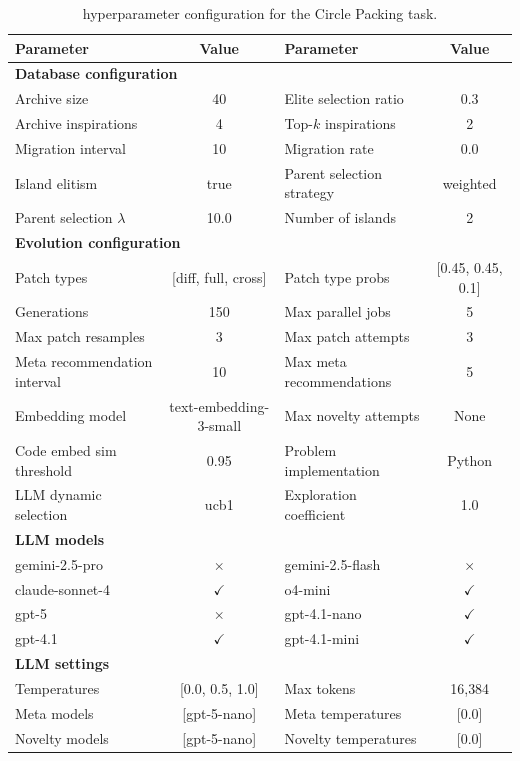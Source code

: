 \begin{table}[h]
\centering
\small
\begin{tabular}{lclc}
\toprule
\textbf{Parameter} & \textbf{Value} & \textbf{Parameter} & \textbf{Value} \\
\midrule
\multicolumn{4}{l}{\textbf{Database configuration}} \\
\midrule
Archive size & 40 & Elite selection ratio & 0.3 \\
Archive inspirations & 4 & Top-$k$ inspirations & 2 \\
Migration interval & 10 & Migration rate & 0.0 \\
Island elitism & true & Parent selection strategy & weighted \\
Parent selection $\lambda$ & 10.0 & Number of islands & 2 \\
\midrule
\multicolumn{4}{l}{\textbf{Evolution configuration}} \\
\midrule
Patch types & [diff, full, cross] & Patch type probs & [0.45, 0.45, 0.1] \\
Generations & 150 & Max parallel jobs & 5 \\
Max patch resamples & 3 & Max patch attempts & 3 \\
Meta recommendation interval & 10 & Max meta recommendations & 5 \\
Embedding model & text-embedding-3-small & Max novelty attempts & None \\
Code embed sim threshold & 0.95 & Problem implementation & Python \\
LLM dynamic selection & ucb1 & Exploration coefficient & 1.0 \\
\midrule
\multicolumn{4}{l}{\textbf{LLM models}} \\
\midrule
gemini-2.5-pro & $\times$ & gemini-2.5-flash & $\times$ \\
claude-sonnet-4 & $\checkmark$ & o4-mini & $\checkmark$ \\
gpt-5 & $\times$ & gpt-4.1-nano & $\checkmark$ \\
gpt-4.1 & $\checkmark$ & gpt-4.1-mini & $\checkmark$ \\
\midrule
\multicolumn{4}{l}{\textbf{LLM settings}} \\
\midrule
Temperatures & [0.0, 0.5, 1.0] & Max tokens & 16{,}384 \\
Meta models & [gpt-5-nano] & Meta temperatures & [0.0] \\
Novelty models & [gpt-5-nano] & Novelty temperatures & [0.0] \\
\bottomrule
\end{tabular}
\caption{\ouralgo{} hyperparameter configuration for the Circle Packing task.}
\label{tab:hyperparams_circle}
\end{table}

